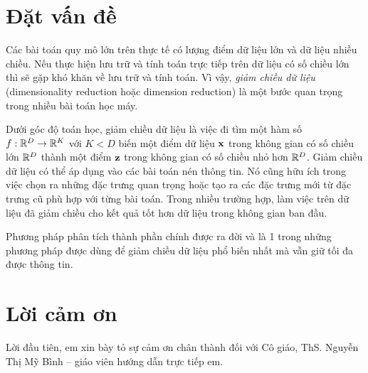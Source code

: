 

\section{Đặt vấn đề}

Các bài toán quy mô lớn trên thực tế có lượng điểm dữ liệu lớn và dữ liệu nhiều
chiều. Nếu thực hiện lưu trữ và tính toán trực tiếp trên dữ liệu có số chiều lớn
thì sẽ gặp khó khăn về lưu trữ và tính toán. Vì vậy, \textit{giảm
    chiều dữ liệu} ({dimensionality reduction} hoặc {dimension reduction}) là một
bước quan trọng trong nhiều bài toán học máy.


Dưới góc độ toán học, giảm chiều dữ liệu là việc đi tìm một hàm số $f: \mathbb{R}^D
    \rightarrow \mathbb{R}^K$ với $K < D$ biến một điểm dữ liệu $\mathbf{x}$ trong không gian có số
chiều lớn $\mathbb{R}^D$ thành một điểm $\mathbf{z}$ trong không gian có số chiều nhỏ hơn
$\mathbb{R}^D$. Giảm chiều dữ liệu có thể áp dụng vào các bài toán nén thông tin. Nó cũng hữu ích trong việc chọn ra những đặc trưng quan trọng hoặc
tạo ra các đặc trưng mới từ đặc trưng cũ phù hợp với từng bài toán. Trong nhiều trường hợp, làm việc trên dữ liệu đã giảm chiều cho kết quả tốt
hơn dữ liệu trong không gian ban đầu.

Phương pháp phân tích thành phần chính được ra đời và là 1 trong những phương pháp được dùng để giảm chiều dữ liệu phổ biến nhất
mà vẫn giữ tối đa được thông tin.


\newpage
\section{Lời cảm ơn}

Lời đầu tiên, em xin bày tỏ sự cảm ơn chân thành đối với Cô giáo, ThS.
Nguyễn Thị Mỹ Bình – giáo viên hướng dẫn trực tiếp em.


